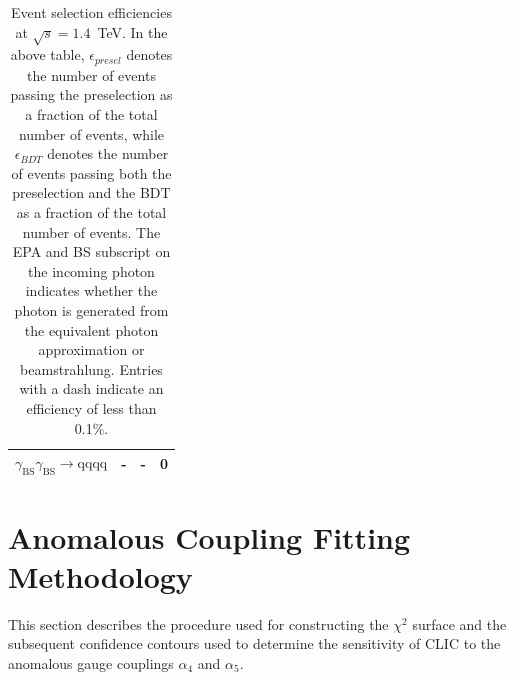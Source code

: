 \begin{table}[h!]
\begin{tabular}{ l r r r }
$\gamma_{\text{BS}}\gamma_{\text{BS}} \rightarrow \text{qqqq}$ & - & - & 0 \\
\hline
\end{tabular}
\caption[Event selection efficiencies at $\sqrt{s}=1.4$~TeV.  In the above table, $\epsilon_{presel}$ denotes the number of events passing the preselection as a fraction of the total number of events, while $\epsilon_{BDT}$ denotes the number of events passing both the preselection and the BDT as a fraction of the total number of events.  The EPA and BS subscript on the incoming photon indicates whether the photon is generated from the equivalent photon approximation or beamstrahlung.  Entries with a dash indicate an efficiency of less than 0.1\%.]{Event selection efficiencies at $\sqrt{s}=1.4$~TeV.  In the above table, $\epsilon_{presel}$ denotes the number of events passing the preselection as a fraction of the total number of events, while $\epsilon_{BDT}$ denotes the number of events passing both the preselection and the BDT as a fraction of the total number of events.  The EPA and BS subscript on the incoming photon indicates whether the photon is generated from the equivalent photon approximation or beamstrahlung.  Entries with a dash indicate an efficiency of less than 0.1\%.}
\label{table:selectionsummary1400GeV}
\end{table}


\section{Anomalous Coupling Fitting Methodology}
\label{sec:fitting}
This section describes the procedure used for constructing the $\chi^{2}$ surface and the subsequent confidence contours used to determine the sensitivity of CLIC to the anomalous gauge couplings $\alpha_{4}$ and $\alpha_{5}$.


